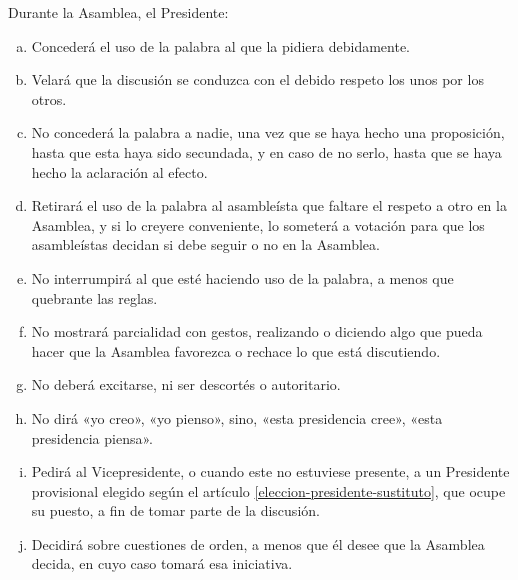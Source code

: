 \article
Durante la Asamblea, el Presidente:
\begin{enumerate}[a)]
    \item Concederá el uso de la palabra al que la pidiera debidamente.
    \item Velará que la discusión se conduzca con el debido respeto los unos por los otros.
    \item No concederá la palabra a nadie, una vez que se haya hecho una proposición, hasta que esta haya sido secundada, y en caso de no serlo, hasta que se haya hecho la aclaración al efecto.
    \item Retirará el uso de la palabra al asambleísta que faltare el respeto a otro en la Asamblea, y si lo creyere conveniente, lo someterá a votación para que los asambleístas decidan si debe seguir o no en la Asamblea.
    \item No interrumpirá al que esté haciendo uso de la palabra, a menos que quebrante las reglas.
    \item No mostrará parcialidad con gestos, realizando o diciendo algo que pueda hacer que la Asamblea favorezca o rechace lo que está discutiendo.
    \item No deberá excitarse, ni ser descortés o autoritario.
    \item No dirá «yo creo», «yo pienso», sino, «esta presidencia cree», «esta presidencia piensa».
    \item Pedirá al Vicepresidente, o cuando este no estuviese presente, a un Presidente provisional elegido según el artículo \ref{eleccion-presidente-sustituto}, que ocupe su puesto, a fin de tomar parte de la discusión.
    \item Decidirá sobre cuestiones de orden, a menos que él desee que la Asamblea decida, en cuyo caso tomará esa iniciativa.
\end{enumerate}

